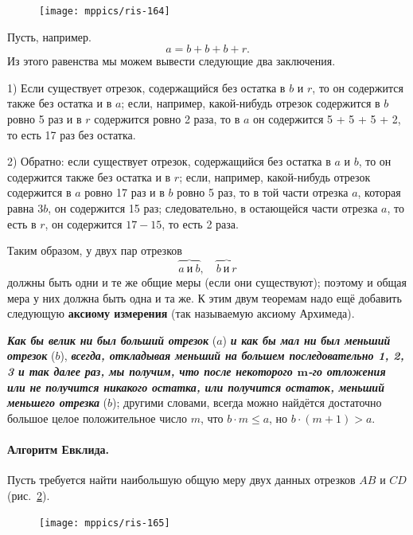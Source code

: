 \documentclass[twoside]{book}
\makeatletter
\newcommand{\rindex}[2][\imki@jobname]{%
  \index[#1]{\detokenize{#2}}%
}
\makeatother
\begin{document}
\begin{figure}
\centering
\texttt{[image: mppics/ris-164]}
\caption{}\label{1938/ris-164}
\end{figure}

Пусть, например.
\[a=b+b+b+r.\]
Из этого равенства мы можем вывести следующие два заключения.

1) Если существует отрезок, содержащийся без остатка в $b$ и $r$, то он содержится также без остатка и в $a$;
если, например, какой-нибудь отрезок содержится в $b$ ровно 5 раз и в $r$ содержится ровно 2 раза, то в $a$ он содержится 5 + 5 + 5 + 2, то есть 17 раз без остатка.

2) Обратно:
если существует отрезок, содержащийся без остатка в $a$ и $b$, то он содержится также без остатка и в $r$;
если, например, какой-нибудь отрезок содержится в $a$ ровно 17 раз и в $b$ ровно 5 раз, то в той части отрезка $a$, которая равна $3b$, он содержится 15 раз;
следовательно, в остающейся части отрезка $a$, то есть в $r$, он содержится $17-15$, то есть 2 раза.

Таким образом, у двух пар отрезков
\[\overbrace{a\ \text{и}\ b},\quad \overbrace{b\ \text{и}\ r}\]
должны быть одни и те же общие меры (если они существуют);
поэтому и  общая мера у них должна быть одна и та же.
К этим двум теоремам надо ещё добавить следующую \rindex{аксиома измерения}\textbf{аксиому измерения} (так называемую \rindex{аксиома Архимеда}аксиому Архимеда). 

\textbf{\emph{Как бы велик ни был больший отрезок}} ($a$) \textbf{\emph{и как бы мал ни был меньший отрезок}} ($b$), \textbf{\emph{всегда, откладывая меньший на большем последовательно 1, 2, 3 и так далее раз, мы получим, что после некоторого $\bm{m}$-го отложения или не получится никакого остатка, или получится остаток, меньший меньшего отрезка}} ($b$);
другими словами, всегда можно найдётся достаточно большое целое положительное число $m$, что $b \cdot  m \le a$, но $b \cdot  (m + 1) > a$. 

\paragraph{Алгоритм Евклида.}\label{1938/147}
Пусть требуется найти наибольшую общую меру двух данных отрезков $AB$ и $CD$ (рис.~\ref{1938/ris-165}).

\begin{figure}
\centering
\texttt{[image: mppics/ris-165]}
\caption{}\label{1938/ris-165}
\end{figure}
\end{document}
